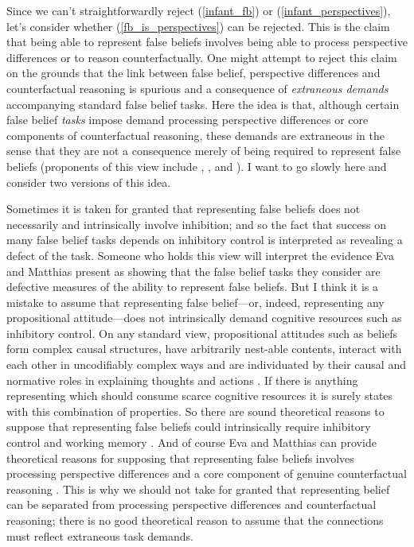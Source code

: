 \documentclass[12pt,\papersize]{extarticle}
\begin{document}
Since we can't straightforwardly reject (\ref{infant_fb}) or (\ref{infant_perspectives}),
let's consider whether (\ref{fb_is_perspectives}) can be rejected.
This is the claim that being able to represent false beliefs involves being able to process perspective differences or to reason counterfactually.
One might attempt to reject this claim on the grounds that the link between false belief, perspective differences and counterfactual reasoning 
is spurious and a consequence of \emph{extraneous demands} accompanying standard false belief tasks.
Here the idea is that, although certain false belief \emph{tasks} impose demand processing perspective differences or core components of counterfactual reasoning,
these demands are extraneous in the sense that they are not a consequence merely of being required to represent false beliefs
(proponents of this view include 
	\citealp[p.\ 417]{Carpenter:2002gc},
	\citealp{Bloom:2000bt}, and
	\citealp{Leslie:1998nq}).
I want to go slowly here and consider two versions of this idea.

Sometimes it is taken for granted that representing false beliefs does not necessarily and intrinsically involve inhibition;
and so the fact that success on many false belief tasks depends on inhibitory control is interpreted as revealing a defect of the task.
Someone who holds this view will interpret the evidence Eva and Matthias present as showing that the false belief tasks they consider are defective measures of the ability to represent false beliefs.
But I think it is a mistake to assume that representing false belief---or, indeed, representing any propositional attitude---does not intrinsically demand cognitive resources such as inhibitory control.
On any standard view, propositional attitudes such as beliefs form complex causal structures, have arbitrarily nest-able contents, interact with each other in uncodifiably complex ways and are individuated by their causal and normative roles in explaining thoughts and actions \citep[]{en_809, en_249}.  
If there is anything representing which should consume scarce cognitive resources it is surely states with this combination of properties.
So there are sound theoretical reasons to suppose that representing false beliefs could intrinsically require inhibitory control and working memory \citep[see also][]{Russell:1999vr}.
And of course Eva and Matthias can provide theoretical reasons for supposing that representing false beliefs involves processing perspective differences and a core component of genuine counterfactual reasoning \citep{perner:2007_objects}. 
This is why we should not take for granted that representing belief can be separated from processing perspective differences and counterfactual reasoning; there is no good theoretical reason to assume that the connections must reflect extraneous task demands. 
\end{document}
